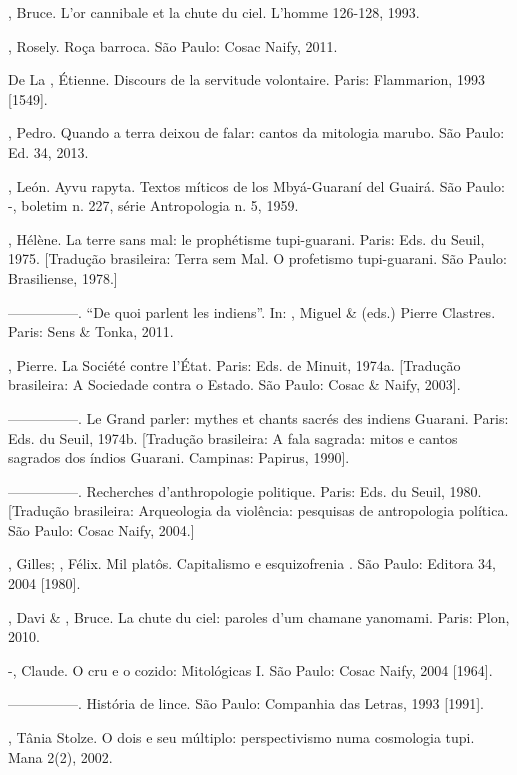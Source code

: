 \begin{Parskip}
, Bruce. L’or cannibale et la chute du ciel. L’homme 126-128,
1993.

 , Rosely. Roça barroca. São Paulo: Cosac Naify, 2011.

De La , Étienne. Discours de la servitude volontaire. Paris:
Flammarion, 1993 [1549].

, Pedro. Quando a terra deixou de falar: cantos da mitologia
marubo. São Paulo: Ed. 34, 2013.

, León. Ayvu rapyta. Textos míticos de los Mbyá-Guaraní del
Guairá. São Paulo: -, boletim n. 227, série Antropologia n. 5,
1959.

, Hélène. La terre sans mal: le prophétisme tupi-guarani. Paris:
Eds. du Seuil, 1975. [Tradução brasileira: Terra sem Mal. O profetismo
tupi-guarani. São Paulo: Brasiliense, 1978.]

—————. ``De quoi parlent les indiens''. In: , Miguel \& 
(eds.) Pierre Clastres. Paris: Sens \& Tonka, 2011.

, Pierre. La Société contre l’État. Paris: Eds. de Minuit,
1974a. [Tradução brasileira: A Sociedade contra o Estado. São Paulo:
Cosac \& Naify, 2003].

—————. Le Grand parler: mythes et chants sacrés des indiens Guarani.
Paris: Eds. du Seuil, 1974b. [Tradução brasileira: A fala sagrada:
mitos e cantos sagrados dos índios Guarani. Campinas: Papirus, 1990]. 

—————. Recherches d’anthropologie politique. Paris: Eds. du Seuil, 1980.
[Tradução brasileira: Arqueologia da violência: pesquisas de
antropologia política. São Paulo: Cosac Naify, 2004.] 

, Gilles; , Félix. Mil platôs. Capitalismo e
esquizofrenia . São Paulo: Editora 34, 2004 [1980].

, Davi \& , Bruce. La chute du ciel: paroles d’um chamane
yanomami. Paris: Plon, 2010.

-, Claude. O cru e o cozido: Mitológicas I. São Paulo: Cosac
Naify, 2004 [1964].

—————. História de lince. São Paulo: Companhia das Letras, 1993 [1991]. 

, Tânia Stolze. O dois e seu múltiplo: perspectivismo numa
cosmologia tupi. Mana 2(2), 2002.


\end{Parskip}
